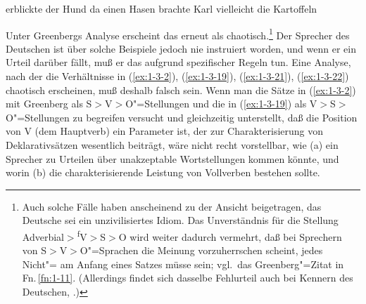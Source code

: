 \documentclass[output=paper]{langsci/langscibook}
\begin{document}
\begin{exe}
\ex\label{ex:1-3-22}
\begin{xlist}
\ex\label{ex:1-3-22a} erblickte der Hund da einen Hasen
\ex\label{ex:1-3-22b} brachte Karl vielleicht die Kartoffeln
\end{xlist}
\end{exe}
Unter Greenbergs Analyse erscheint das erneut als chaotisch.\footnote{%
  Auch solche Fälle haben anscheinend zu der Ansicht beigetragen, das Deutsche sei ein
  unzivilisiertes Idiom. Das Unverständnis für die Stellung Adverbial$>$\textsuperscript{f}V$>$S$>$O
  wird weiter dadurch vermehrt, daß bei Sprechern von S$>$V$>$O"=Sprachen die Meinung vorzuherrschen
  scheint, jedes Nicht"= am Anfang eines Satzes müsse  sein; vgl.\ das
  Greenberg"=Zitat in Fn.\,\ref{fn:1-11}. (Allerdings findet sich dasselbe Fehlurteil auch bei Kennern des
  Deutschen, \zb \citet[561]{Adelung1782}.)%
}
Der Sprecher des
Deutschen ist über solche Beispiele jedoch nie instruiert worden, und wenn er ein
Urteil darüber fällt, muß er das aufgrund spezifischer Regeln tun. Eine Analyse,
nach der die Verhältnisse in (\ref{ex:1-3-2}), (\ref{ex:1-3-19}), (\ref{ex:1-3-21}), (\ref{ex:1-3-22}) chaotisch erscheinen, muß deshalb
falsch sein. Wenn man die Sätze in (\ref{ex:1-3-2}) mit Greenberg als S$>$V$>$O"=Stellungen und die
in (\ref{ex:1-3-19}) als V$>$S$>$O"=Stellungen zu begreifen versucht und gleichzeitig unterstellt, daß
die Position von V (dem Hauptverb) ein Parameter ist, der zur Charakterisierung
von Deklarativsätzen wesentlich beiträgt, wäre nicht recht vorstellbar, wie (a) ein
Sprecher zu Urteilen über unakzeptable Wortstellungen kommen könnte, und worin
(b) die charakterisierende Leistung von Vollverben bestehen sollte.
\end{document}
